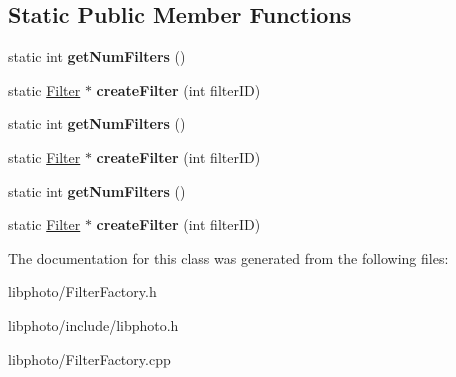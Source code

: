 \subsection*{Static Public Member Functions}
\begin{DoxyCompactItemize}
\item 
\hypertarget{classFilterFactory_a978466237a3acfbd5570fbf1d4dc1080}{static int {\bfseries get\-Num\-Filters} ()}\label{classFilterFactory_a978466237a3acfbd5570fbf1d4dc1080}

\item 
\hypertarget{classFilterFactory_afa9986fc11ea262c26febc9191a19f47}{static \hyperlink{classFilter}{Filter} $\ast$ {\bfseries create\-Filter} (int filter\-I\-D)}\label{classFilterFactory_afa9986fc11ea262c26febc9191a19f47}

\item 
\hypertarget{classFilterFactory_a641c48aaef1303ce9973f50e5d65606d}{static int {\bfseries get\-Num\-Filters} ()}\label{classFilterFactory_a641c48aaef1303ce9973f50e5d65606d}

\item 
\hypertarget{classFilterFactory_a7302b3400ac1e82ccc2dc1af615648fe}{static \hyperlink{classFilter}{Filter} $\ast$ {\bfseries create\-Filter} (int filter\-I\-D)}\label{classFilterFactory_a7302b3400ac1e82ccc2dc1af615648fe}

\item 
\hypertarget{classFilterFactory_a641c48aaef1303ce9973f50e5d65606d}{static int {\bfseries get\-Num\-Filters} ()}\label{classFilterFactory_a641c48aaef1303ce9973f50e5d65606d}

\item 
\hypertarget{classFilterFactory_a7302b3400ac1e82ccc2dc1af615648fe}{static \hyperlink{classFilter}{Filter} $\ast$ {\bfseries create\-Filter} (int filter\-I\-D)}\label{classFilterFactory_a7302b3400ac1e82ccc2dc1af615648fe}

\end{DoxyCompactItemize}


The documentation for this class was generated from the following files\-:\begin{DoxyCompactItemize}
\item 
libphoto/Filter\-Factory.\-h\item 
libphoto/include/libphoto.\-h\item 
libphoto/Filter\-Factory.\-cpp\end{DoxyCompactItemize}
